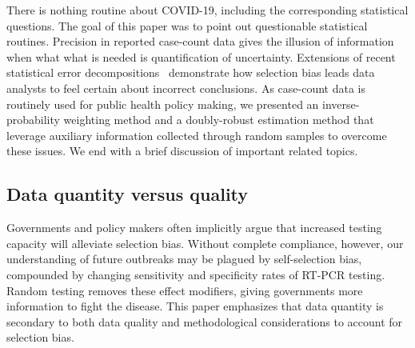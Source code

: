 \documentclass[11pt]{amsart}
\numberwithin{equation}{section}
\theoremstyle{plain}
\begin{document}
 There is nothing routine about COVID-19, including the corresponding statistical questions.  The goal of this paper was to point out questionable statistical routines.  Precision in reported case-count data gives the illusion of information when what what is needed is quantification of uncertainty. Extensions of recent statistical error decompositions~\citep{Meng2018} demonstrate how selection bias leads data analysts to feel certain about incorrect conclusions.  As case-count data is routinely used for public health policy making, we presented an inverse-probability weighting method and a doubly-robust estimation method that leverage auxiliary information collected through random samples to overcome these issues. We end with a brief discussion of important related topics.

 \subsection*{Data quantity versus quality}

 Governments and policy makers often implicitly argue that increased testing capacity will alleviate selection bias.  Without complete compliance, however, our understanding of future outbreaks may be plagued by self-selection bias, compounded by changing sensitivity and specificity rates of RT-PCR testing. Random testing removes these effect modifiers, giving governments more information to fight the disease.  This paper emphasizes that data quantity is secondary to both data quality and methodological considerations to account for selection bias.


\end{document}
